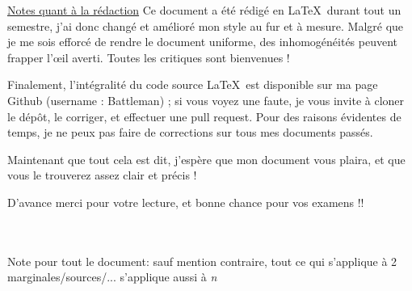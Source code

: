 \documentclass[11pt,a4paper]{article}
\begin{document}
\uline{Notes quant à la rédaction}
Ce document a été rédigé en \LaTeX\ durant tout un semestre, j'ai donc changé et amélioré mon style au fur et à mesure. Malgré que je me sois efforcé de rendre le document uniforme, des inhomogénéités peuvent frapper l'\oe il averti. Toutes les critiques sont bienvenues !
\begin{blackbox}
    Finalement, l'intégralité du code source \LaTeX\ est disponible sur ma page Github (username : Battleman) ; si vous voyez une faute, je vous invite à cloner le dépôt, le corriger, et effectuer une pull request. Pour des raisons évidentes de temps, je ne peux pas faire de corrections sur tous mes documents passés.
\end{blackbox}
Maintenant que tout cela est dit, j'espère que mon document vous plaira, et que vous le trouverez assez clair et précis !

D'avance merci pour votre lecture, et bonne chance pour vos examens !!\\
\\
\\
\newpage
\begin{boite}
	Note pour tout le document: sauf mention contraire, tout ce qui s'applique à 2 marginales/sources/... s'applique aussi à \textit{n}
\end{boite}
\end{document}
